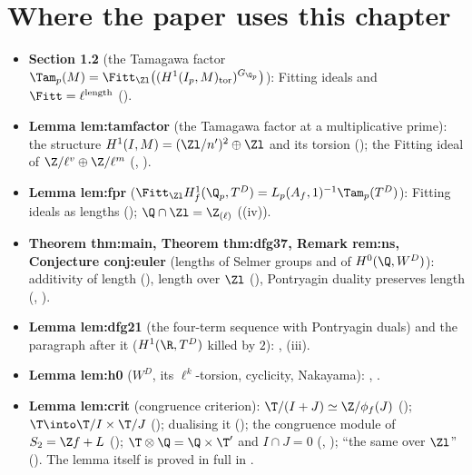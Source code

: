 \section*{Where the paper uses this chapter}

\begin{itemize}
\item \textbf{Section 1.2} (the Tamagawa factor $\Tam_p(M)=\Fitt_{\Zl}\bigl((H^1(I_p,M)_{\mathrm{tor}})^{G_{\Q_p}}\bigr)$): Fitting ideals and $\Fitt=\ell^{\mathrm{length}}$
().
\item \textbf{Lemma lem:tamfactor} (the Tamagawa factor at a multiplicative prime): the structure $H^1(I,M)=(\Zl/n')^2\oplus\Zl$ and its torsion
(); the Fitting ideal of $\Z/\ell^v\oplus\Z/\ell^m$ (, ).
\item \textbf{Lemma lem:fpr} ($\Fitt_{\Zl}H^1_f(\Q_p,T^D)=L_p(A_f,1)^{-1}\Tam_p(T^D)$): Fitting ideals as lengths (); $\Q\cap\Zl=\Z_{(\ell)}$
((iv)).
\item \textbf{Theorem thm:main, Theorem thm:dfg37, Remark rem:ns, Conjecture conj:euler} (lengths of Selmer groups and of $H^0(\Q,W^D)$): additivity of length (), length over $\Zl$
(), Pontryagin duality preserves length (, ).
\item \textbf{Lemma lem:dfg21} (the four-term sequence with Pontryagin duals) and the paragraph after it ($H^1(\R,T^D)$ killed by $2$): ,
(iii).
\item \textbf{Lemma lem:h0} ($W^D$, its $\ell^k$-torsion, cyclicity, Nakayama): , .
\item \textbf{Lemma lem:crit} (congruence criterion): $\T/(I+J)\simeq\Z/\phi_f(J)$ (); $\T\into\T/I\times\T/J$ (); dualising
it (); the congruence module of $S_2=\Z f+L$ (); $\T\otimes\Q=\Q\times\T'$ and
$I\cap J=0$ (, ); ``the same over $\Zl$'' (). The lemma
itself is proved in full in .

\end{itemize}

